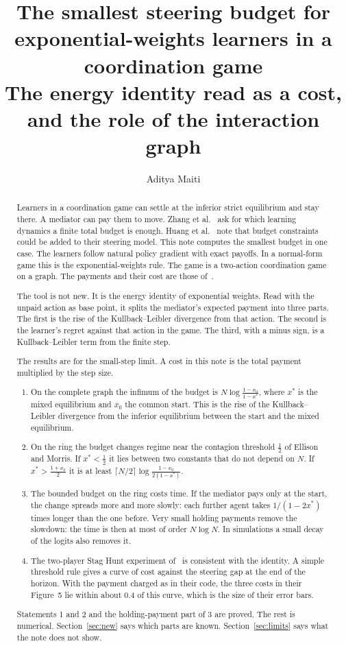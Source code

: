 \documentclass[11pt,a4paper]{article}
\title{\textbf{The smallest steering budget for\\ exponential-weights learners in a coordination game}\\[0.4em]
\large The energy identity read as a cost, and the role of the interaction graph}
\author{Aditya Maiti}
\date{}
\theoremstyle{definition}
\theoremstyle{plain}
\newcommand{\xs}{x^{*}}
\begin{document}
\maketitle

\begin{abstract}
\noindent
Learners in a coordination game can settle at the inferior strict equilibrium and stay there.
A mediator can pay them to move.
Zhang et al.~\cite{zhang2024} ask for which learning dynamics a finite total budget is enough.
Huang et al.~\cite{huang2025} note that budget constraints could be added to their steering model.
This note computes the smallest budget in one case. The learners follow natural policy gradient with exact payoffs. In a normal-form game this is the exponential-weights rule. The game is a two-action coordination game on a graph. The payments and their cost are those of~\cite{huang2025}.

The tool is not new. It is the energy identity of exponential weights. Read with the unpaid action as base point, it splits the mediator's expected payment into three parts. The first is the rise of the Kullback--Leibler divergence from that action. The second is the learner's regret against that action in the game. The third, with a minus sign, is a Kullback--Leibler term from the finite step.

The results are for the small-step limit. A cost in this note is the total payment multiplied by the step size.
\begin{enumerate}
\item On the complete graph the infimum of the budget is $N\log\frac{1-x_0}{1-\xs}$, where $\xs$ is the mixed equilibrium and $x_0$ the common start. This is the rise of the Kullback--Leibler divergence from the inferior equilibrium between the start and the mixed equilibrium.
\item On the ring the budget changes regime near the contagion threshold $\tfrac12$ of Ellison and Morris. If $\xs<\tfrac12$ it lies between two constants that do not depend on $N$. If $\xs>\tfrac{1+x_0}{2}$ it is at least $\lceil N/2\rceil\log\frac{1-x_0}{2(1-\xs)}$.
\item The bounded budget on the ring costs time. If the mediator pays only at the start, the change spreads more and more slowly: each further agent takes $1/(1-2\xs)$ times longer than the one before. Very small holding payments remove the slowdown: the time is then at most of order $N\log N$. In simulations a small decay of the logits also removes it.
\item The two-player Stag Hunt experiment of~\cite{huang2025} is consistent with the identity. A simple threshold rule gives a curve of cost against the steering gap at the end of the horizon. With the payment charged as in their code, the three costs in their Figure~5 lie within about $0.4$ of this curve, which is the size of their error bars.
\end{enumerate}
Statements 1 and 2 and the holding-payment part of 3 are proved. The rest is numerical. Section~\ref{sec:new} says which parts are known. Section~\ref{sec:limits} says what the note does not show.
\end{abstract}
\end{document}
